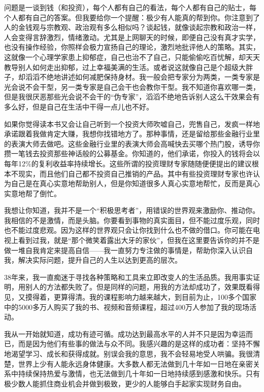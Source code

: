 问题是一谈到钱（和投资），每个人都有自己的看法，每个人都有自己的贴士，每个人都有自己的答案。但我要给你一个提醒：极少有人能真的帮到你。你注意到了人的金钱观与宗教观、政治观有多么相似吗？谈起钱，就像谈起宗教和政治一样，人会变得言辞激烈，情绪激动。尤其是上网聊天的时候，即便自己没有真才实学，也没有操作经验，你照样会极力宣扬自己的理论，激烈地批评他人的策略。其实，这就像一个心理学家患上抑郁症，自己也治不了自己，只能偷偷吃百忧解，却天天教导别人如何走出抑郁，过上幸福美满的生活。或者说这就像自己是个超级大胖子，却滔滔不绝地讲述如何减肥保持身材。我一般会把专家分为两类，一类专家是光会说不会干型，另一类专家是自己会干也会教你干型。我不知道你喜欢哪一类，但是我很厌恶那些光会说不会干的“伪专家”，滔滔不绝地告诉别人这么干效果会有多么好，但是自己在生活中干得一点儿也不好。

如果你觉得读本书又会让自己听到一个投资大师吹嘘自己，兜售自己，发疯一样地承诺跟着我做肯定大赚，我想你找错地方了。那种事情，还是留给那些金融行业里的表演大师去做吧。这些金融行业里的表演大师会高喊快去买哪个热门股，诱导你攒一笔钱去投资那些神话般的公募基金。你知道的，他们承诺，你投入的钱将会以每年12\%的复利收益率持续增长。这些所谓的投资理财专家随随便便提出的建议根本不现实，而且他们自己都不投资自己推销的产品。其中有些投资理财专家也许认为自己是在真心实意地帮助别人，但是你知道很多人真心实意地帮忙，反而是真心实意地帮了倒忙。

我想让你知道，我并不是一个“积极思考者”，用错误的世界观来激励你、推动你。我相信的不是激情，而是头脑。你要看到事物的真实面目，但不能过度乐观，同时也不能过度悲观。因为这样的世界观只会让你找到什么也不做的借口。你可能在电视上看到过我，就是“那个微笑着露出大牙的家伙”，但我在这里要告诉你的并不是做一堆自我肯定来提高自信——我一直努力专注做的事情是，帮助你深入认识自我，解决实际问题，提升自己的人生以达到更高的层次。

38年来，我一直痴迷于寻找各种策略和工具来立即改变人的生活品质。我用事实证明，用别人的方法都失败了。但是同样的问题，用我的方法却成功了，效果既看得见，又摸得着，更算得清。我的课程影响力越来越大，到目前为止，100多个国家中的5000多万人购买了我的书、视频和音频课程，超过400万人参加了我的现场活动。

我从一开始就知道，成功有迹可循。成功达到最高水平的人并不只是因为幸运而已，而是因为他们有些事的做法与众不同。我感兴趣的是这样的成功者：坚持不懈地渴望学习、成长和获得成就。别误会我的意思，我不会轻易地受人哄骗。我很清楚，世界上少有人能永远身体健康。大多数人都无法做到几十年如一日地在亲密关系中持续保持热爱与激情，也无法做到几十年如一日地持续感到感激和快乐。只有极少数人能抓住商业机会并做到极致，更少的人能够白手起家实现财务自由。

